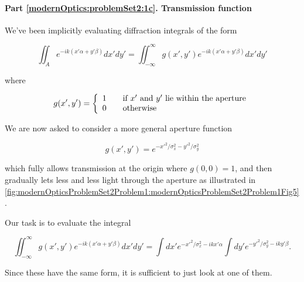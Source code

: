 {%
\paragraph{Part \ref{modernOptics:problemSet2:1c}.  Transmission function}

We've been implicitly evaluating diffraction integrals of the form

\begin{equation}\label{eqn:modernOptics:ProblemSet2:P1:410}
\iint_A e^{-i k( x'\alpha + y' \beta) } dx' dy'
= \iint_{-\infty}^\infty g(x', y') e^{-i k( x'\alpha + y' \beta) } dx' dy'
\end{equation}

where 

\begin{equation}\label{eqn:modernOptics:ProblemSet2:P1:430}
g(x', y') = 
\left\{
\begin{array}{l l}
1 & \quad \mbox{if $x'$ and $y'$ lie within the aperture} \\
0 & \quad \mbox{otherwise}
\end{array}
\right.
\end{equation}

We are now asked to consider a more general aperture function

\begin{equation}\label{eqn:modernOptics:ProblemSet2:P1:450}
g(x', y') = e^{-{x'}^2/\sigma_x^2 - {y'}^2/\sigma_y^2}
\end{equation}

which fully allows transmission at the origin where $g(0, 0) = 1$, and then gradually lets less and less light through the aperture as illustrated in \cref{fig:modernOpticsProblemSet2Problem1:modernOpticsProblemSet2Problem1Fig5}.


Our task is to evaluate the integral

\begin{equation}\label{eqn:modernOptics:ProblemSet2:P1:470}
\iint_{-\infty}^\infty g(x', y') e^{-i k( x'\alpha + y' \beta) } dx' dy'
=
\int dx' e^{-{x'}^2/\sigma_x^2 -i k x' \alpha}
\int dy' e^{-{y'}^2/\sigma_y^2 -i k y' \beta}.
\end{equation}

Since these have the same form, it is sufficient to just look at one of them.

}
